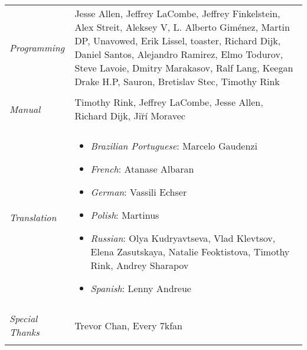 \begin{tabular}{p{1in} p{3in}}
    \textit{Programming} & Jesse Allen, Jeffrey LaCombe, Jeffrey Finkelstein, Alex Streit, Aleksey V, L. Alberto Giménez, Martin DP, Unavowed, Erik Lissel, toaster, Richard Dijk, Daniel Santos, Alejandro Ramirez, Elmo Todurov, Steve Lavoie, Dmitry Marakasov, Ralf Lang, Keegan Drake H.P, Sauron, Bretislav Stec, Timothy Rink \\ \\
    \textit{Manual} & Timothy Rink, Jeffrey LaCombe, Jesse Allen, Richard Dijk, Ji\u{r}í Moravec \\ \\
    \textit{Translation} & 
        \begin{itemize}
            \item \textit{Brazilian Portuguese}: Marcelo Gaudenzi
            \item \textit{French}: Atanase Albaran
            \item \textit{German}: Vassili Echser
            \item \textit{Polish}: Martinus
            \item \textit{Russian}: Olya Kudryavtseva, Vlad Klevtsov, Elena Zasutskaya, Natalie Feoktistova, Timothy Rink, Andrey Sharapov
            \item \textit{Spanish}: Lenny Andreue
        \end{itemize} \\ \\
    \textit{Special Thanks} & Trevor Chan, Every 7kfan \\ \\
\end{tabular}
